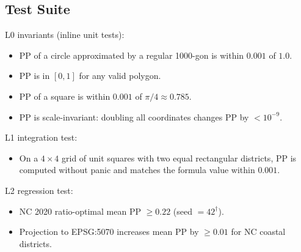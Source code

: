 \subsection{Test Suite}

L0 invariants (inline unit tests):
\begin{itemize}
  \item PP of a circle approximated by a regular 1000-gon is within $0.001$ of $1.0$.
  \item PP is in $[0,1]$ for any valid polygon.
  \item PP of a square is within $0.001$ of $\pi/4 \approx 0.785$.
  \item PP is scale-invariant: doubling all coordinates changes PP by $< 10^{-9}$.
\end{itemize}

L1 integration test:
\begin{itemize}
  \item On a $4 \times 4$ grid of unit squares with two equal rectangular districts,
    PP is computed without panic and matches the formula value within $0.001$.
\end{itemize}

L2 regression test:
\begin{itemize}
  \item NC 2020 ratio-optimal mean PP $\geq 0.22$ (seed $= 42^\dagger$).
  \item Projection to EPSG:5070 increases mean PP by $\geq 0.01$ for NC coastal districts.
\end{itemize}

